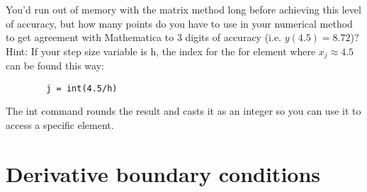 \begin{problem}
\begin{enumerate}[label=(\alph*)]
	You\rq d run out of memory with the matrix method long before achieving this level of accuracy, but how many points do you have to use in your numerical method to get agreement with Mathematica to 3 digits of accuracy (i.e. $y(4.5) = 8.72$)?		
		\\
		Hint: If your step size variable is h, the index for the for element where
$x_j \approx 4.5$ can be found this way:
	\begin{lstlisting}
		j = int(4.5/h)
	\end{lstlisting}
	The int command rounds the result and casts it as an integer so you can use it to access a specific element.
	\end{enumerate}
\end{problem}
	
\section*{Derivative boundary conditions}

